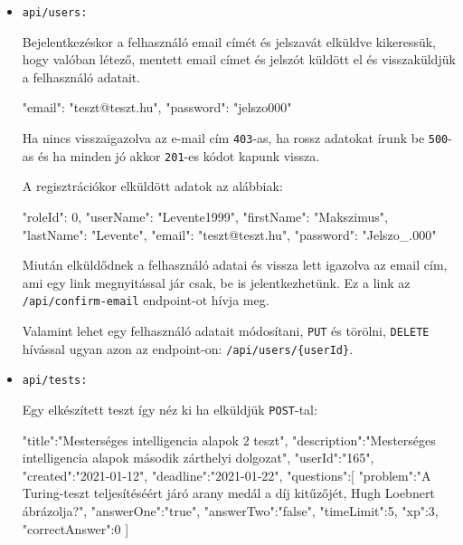 \begin{itemize}[label={$\bullet$}, topsep=0pt, itemsep=0pt, leftmargin=15pt]
    \item[] {\nolinkurl{api/users:}}
          \begin{addmargin}[\parindent]{0pt}
              Bejelentkezéskor a felhasználó email címét és jelszavát elküldve kikeressük, hogy valóban létező, mentett email címet és jelszót küldött el és visszaküldjük a felhasználó adatait. 
              \begin{json}
{
    "email": "teszt@teszt.hu",
    "password": "jelszo000"
}
              \end{json}
              Ha nincs visszaigazolva az e-mail cím \nolinkurl{403}-as, ha rossz adatokat írunk be \nolinkurl{500}-as és ha minden jó akkor \nolinkurl{201}-es kódot kapunk vissza. \newline

              A regisztrációkor elküldött adatok az alábbiak:

              \begin{json}
{
    "roleId": 0,
    "userName": "Levente1999",
    "firstName": "Makszimus",
    "lastName": "Levente",
    "email": "teszt@teszt.hu",
    "password": "Jelszo_.000"
}
              \end{json}

              Miután elküldődnek a felhasználó adatai és vissza lett igazolva az email cím, ami egy link megnyitással jár csak, be is jelentkezhetünk. Ez a link az \nolinkurl{/api/confirm-email} endpoint-ot hívja meg. \newline

              Valamint lehet egy felhasználó adatait módosítani, \nolinkurl{PUT} és törölni, \nolinkurl{DELETE} hívással ugyan azon az endpoint-on: \nolinkurl{/api/users/{userId}}.
          \end{addmargin}
\end{itemize}


\begin{itemize}[label={$\bullet$}, topsep=0pt, itemsep=0pt, leftmargin=15pt]
    \item[] {\nolinkurl{api/tests:}}
          \begin{addmargin}[\parindent]{0pt}
              
              Egy elkészített teszt így néz ki ha elküldjük \nolinkurl{POST}-tal:
              \begin{json}
{
    "title":"Mesterséges intelligencia alapok 2 teszt",
    "description":"Mesterséges intelligencia alapok második zárthelyi dolgozat",
    "userId":"165",
    "created":"2021-01-12",
    "deadline":"2021-01-22",
    "questions":[
        {
            "problem":"A Turing-teszt teljesítéséért járó arany medál a díj kitűzőjét, Hugh Loebnert ábrázolja?",
            "answerOne":"true",
            "answerTwo":"false",
            "timeLimit":5,
            "xp":3,
            "correctAnswer":0
        }
    ]
}
              \end{json}
          \end{addmargin}
\end{itemize}

